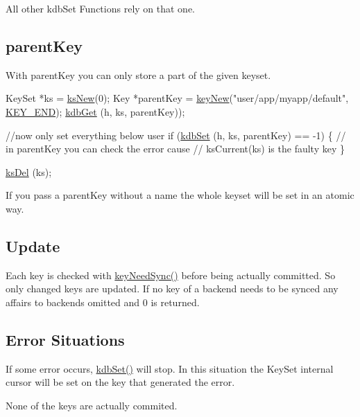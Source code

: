 All other kdb\-Set Functions rely on that one.\hypertarget{group__kdb_kdbsetparent}{}\subsection{parent\-Key}\label{group__kdb_kdbsetparent}
With parent\-Key you can only store a part of the given keyset.


\begin{DoxyCode}
KeySet *ks = \hyperlink{group__keyset_ga671e1aaee3ae9dc13b4834a4ddbd2c3c}{ksNew}(0);
Key *parentKey = \hyperlink{group__key_gaf6893c038b3ebee90c73a9ea8356bebf}{keyNew}(\textcolor{stringliteral}{"user/app/myapp/default"}, \hyperlink{group__key_gga91fb3178848bd682000958089abbaf40aa8adb6fcb92dec58fb19410eacfdd403}{KEY\_END});
\hyperlink{group__kdb_ga28e385fd9cb7ccfe0b2f1ed2f62453a1}{kdbGet} (h, ks, parentKey));

\textcolor{comment}{//now only set everything below user}
\textcolor{keywordflow}{if} (\hyperlink{group__kdb_ga11436b058408f83d303ca5e996832bcf}{kdbSet} (h, ks, parentKey) == -1)
\{
        \textcolor{comment}{// in parentKey you can check the error cause}
        \textcolor{comment}{// ksCurrent(ks) is the faulty key}
\}

\hyperlink{group__keyset_ga27e5c16473b02a422238c8d970db7ac8}{ksDel} (ks);
\end{DoxyCode}


If you pass a parent\-Key without a name the whole keyset will be set in an atomic way.\hypertarget{group__kdb_kdbsetupdate}{}\subsection{Update}\label{group__kdb_kdbsetupdate}
Each key is checked with \hyperlink{group__keytest_gaf247df0de7aca04b32ef80e39ef12950}{key\-Need\-Sync()} before being actually committed. So only changed keys are updated. If no key of a backend needs to be synced any affairs to backends omitted and 0 is returned.\hypertarget{group__kdb_kdbseterror}{}\subsection{Error Situations}\label{group__kdb_kdbseterror}
If some error occurs, \hyperlink{group__kdb_ga11436b058408f83d303ca5e996832bcf}{kdb\-Set()} will stop. In this situation the Key\-Set internal cursor will be set on the key that generated the error.

None of the keys are actually commited.

